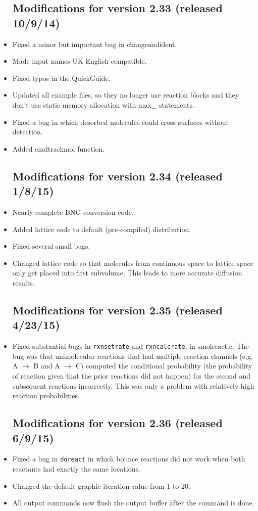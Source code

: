 \documentclass {scrbook}
\newcommand {\ttt} {\texttt}
\begin{document}
\begin{itemize}
\subsection{Modifications for version 2.33 (released 10/9/14)}
\item Fixed a minor but important bug in changemolident.
\item Made input names UK English compatible.
\item Fixed typos in the QuickGuide.
\item Updated all example files, so they no longer use reaction blocks and they don't use static memory allocation with max\_ statements.
\item Fixed a bug in which desorbed molecules could cross surfaces without detection.
\item Added cmdtrackmol function.

\subsection{Modifications for version 2.34 (released 1/8/15)}
\item Nearly complete BNG conversion code.
\item Added lattice code to default (pre-compiled) distribution.
\item Fixed several small bugs.
\item Changed lattice code so that molecules from continuous space to lattice space only get placed into first subvolume. This leads to more accurate diffusion results.

\subsection{Modifications for version 2.35 (released 4/23/15)}
\item Fixed substantial bugs in \ttt{rxnsetrate} and \ttt{rxncalcrate}, in smolreact.c. The bug was that unimolecular reactions that had multiple reaction channels (e.g. A $\rightarrow$ B and A $\rightarrow$ C) computed the conditional probability (the probability of reaction given that the prior reactions did not happen) for the second and subsequent reactions incorrectly. This was only a problem with relatively high reaction probabilities.

\subsection{Modifications for version 2.36 (released 6/9/15)}
\item Fixed a bug in \ttt{doreact} in which bounce reactions did not work when both reactants had exactly the same locations.
\item Changed the default graphic iteration value from 1 to 20.
\item All output commands now flush the output buffer after the command is done.


\end{itemize}
\end{document}

